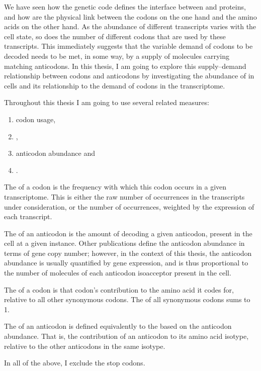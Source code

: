 We have seen how the genetic code defines the interface between \mrna and
proteins, and how \trna[s] are the physical link between the codons on the one
hand and the amino acids on the other hand. As the abundance of different \mrna
transcripts varies with the cell state, so does the number of different codons
that are used by these transcripts. This immediately suggests that the variable
demand of codons to be decoded needs to be met, in some way, by a supply of
\trna molecules carrying matching anticodons. In this thesis, I am going to
explore this supply--demand relationship between codons and anticodons by
investigating the abundance of \trna[s] in cells and its relationship to the
demand of codons in the \mrna transcriptome.

Throughout this thesis I am going to use several related measures:

\begin{enumerate}
    \item codon usage,
    \item \rcu,
    \item anticodon abundance and
    \item \raa.
\end{enumerate}

The  of a codon is the frequency with which this codon
occurs in a given transcriptome. This is either the raw number of occurrences in
the transcripts under consideration, or the number of occurrences, weighted by
the expression of each transcript.

The  of an anticodon is the amount of \trna
decoding a given anticodon, present in the cell at a given instance. Other
publications define the anticodon abundance in terms of \trna gene copy number;
however, in the context of this thesis, the anticodon abundance is usually
quantified by \trna gene expression, and is thus proportional to the number of
\trna molecules of each anticodon isoacceptor present in the cell.

The  of a codon is that codon’s contribution to the amino acid it
codes for, relative to all other synonymous codons. The \rcu of all synonymous
codons sums to \num{1}.

The  of an anticodon is defined equivalently to the \rcu based on
the anticodon abundance. That is, the contribution of an anticodon to its amino
acid isotype, relative to the other anticodons in the same isotype.

In all of the above, I exclude the stop codons.

